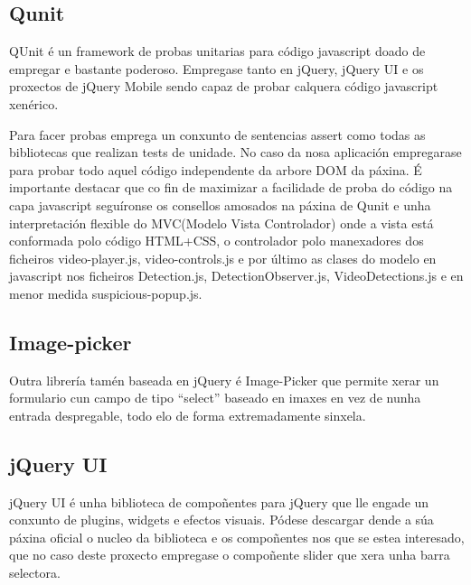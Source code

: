         \subsection{Qunit}
        
            QUnit é un framework de probas unitarias para código javascript doado de empregar e bastante
            poderoso. Empregase tanto en jQuery, jQuery UI e os proxectos de jQuery Mobile sendo capaz 
            de probar calquera código javascript xenérico.
            
            Para facer probas emprega un conxunto de sentencias assert como todas as bibliotecas que 
            realizan tests de unidade. No caso da nosa aplicación empregarase para probar todo aquel
            código independente da arbore DOM da páxina. É importante destacar que co fin de maximizar
            a facilidade de proba do código na capa javascript seguíronse os consellos amosados na páxina
            de Qunit\cite{QunitMakeItTesteable} e unha interpretación flexible do MVC(Modelo 
            Vista Controlador) onde a vista está conformada polo código HTML+CSS, o controlador polo 
            manexadores dos ficheiros video-player.js, video-controls.js e por último as clases do 
            modelo en javascript nos ficheiros Detection.js, DetectionObserver.js, VideoDetections.js e 
            en menor medida suspicious-popup.js.
        
        \subsection{Image-picker}
        
            Outra librería tamén baseada en jQuery é Image-Picker \cite{ImagePickerPage} que permite
            xerar un formulario cun campo de tipo ``select'' baseado en imaxes en vez de nunha 
            entrada despregable, todo elo de forma extremadamente sinxela.
        
        \subsection{jQuery UI}
        
            jQuery UI é unha biblioteca de compoñentes para jQuery que lle engade un conxunto de 
            plugins, widgets e efectos visuais. Pódese descargar dende a súa páxina oficial o 
            nucleo da biblioteca e os compoñentes nos que se estea interesado, que no caso deste
            proxecto  empregase o compoñente slider\cite{ComponenteSliderJqueryUi} que
            xera unha barra selectora.
        
